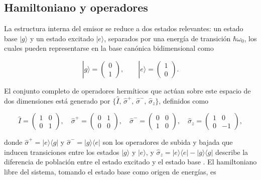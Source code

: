 \subsection{Hamiltoniano y operadores}
\label{sec:tls_hamiltoniano}

La estructura interna del emisor se reduce a dos estados relevantes: un estado base $|g\rangle$ y un estado excitado $|e\rangle$, separados por una energía de transición $\hbar\omega_0$, los cuales pueden representarse en la base canónica bidimensional como

\begin{equation}
	|g\rangle = \begin{pmatrix} 0 \\ 1 \end{pmatrix}, \qquad
	|e\rangle = \begin{pmatrix} 1 \\ 0 \end{pmatrix}.
\end{equation}

El conjunto completo de operadores hermíticos que actúan sobre este espacio de dos dimensiones está generado por $\{\hat{I},\,\hat{\sigma}^+,\,\hat{\sigma}^-,\,\hat{\sigma}_z\}$, definidos como

\begin{equation}
	\hat{I} = \begin{pmatrix} 1 & 0 \\ 0 & 1 \end{pmatrix}, \quad
	\hat{\sigma}^+ = \begin{pmatrix} 0 & 1 \\ 0 & 0 \end{pmatrix}, \quad
	\hat{\sigma}^- = \begin{pmatrix} 0 & 0 \\ 1 & 0 \end{pmatrix}, \quad
	\hat{\sigma}_z = \begin{pmatrix} 1 & 0 \\ 0 & -1 \end{pmatrix},
\end{equation}

donde $\hat{\sigma}^+ = |e\rangle\langle g|$ y $\hat{\sigma}^- = |g\rangle\langle e|$ son los operadores de subida y bajada que inducen transiciones entre los estados $|g\rangle$ y $|e\rangle$, y $\hat{\sigma}_z = |e\rangle\langle e| - |g\rangle\langle g|$ describe la diferencia de población entre el estado excitado y el estado base \cite{gerry2005}. El hamiltoniano libre del sistema, tomando el estado base como origen de energías, es

